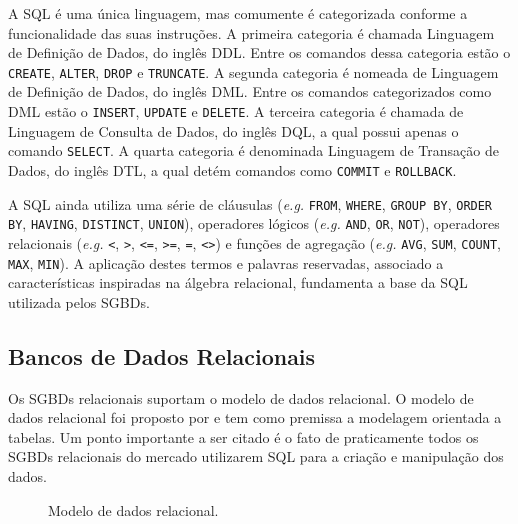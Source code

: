 A \ac{SQL} é uma única linguagem, mas comumente é categorizada conforme a funcionalidade das suas instruções. 
A primeira categoria é chamada Linguagem de Definição de Dados, do inglês \ac{DDL}. 
Entre os comandos dessa categoria estão o \texttt{CREATE}, \texttt{ALTER}, \texttt{DROP} e \texttt{TRUNCATE}. 
A segunda categoria é nomeada de Linguagem de Definição de Dados, do inglês \ac{DML}. 
Entre os comandos categorizados como \ac{DML} estão o \texttt{INSERT}, \texttt{UPDATE} e \texttt{DELETE}. 
A terceira categoria é chamada de Linguagem de Consulta de Dados, do inglês \ac{DQL}, a qual possui apenas o comando \texttt{SELECT}. 
A quarta categoria é denominada Linguagem de Transação de Dados, do inglês \ac{DTL}, a qual detém comandos como \texttt{COMMIT} e \texttt{ROLLBACK}.

A \ac{SQL} ainda utiliza uma série de cláusulas (\textit{e.g.} \texttt{FROM}, \texttt{WHERE}, \texttt{GROUP BY}, \texttt{ORDER BY}, \texttt{HAVING}, \texttt{DISTINCT}, \texttt{UNION}), operadores lógicos (\textit{e.g.} \texttt{AND}, \texttt{OR}, \texttt{NOT}), operadores relacionais (\textit{e.g.} \texttt{<}, \texttt{>}, \texttt{<=}, \texttt{>=}, \texttt{=}, \texttt{<>}) e funções de agregação (\textit{e.g.} \texttt{AVG}, \texttt{SUM}, \texttt{COUNT}, \texttt{MAX}, \texttt{MIN}). 
A aplicação destes termos e palavras reservadas, associado a características inspiradas na álgebra relacional, fundamenta a base da \ac{SQL} utilizada pelos \acp{SGBD}.

    \subsection{Bancos de Dados Relacionais} \label{ssec:SGBDRelacionais}

Os \acp{SGBD} relacionais suportam o modelo de dados relacional. 
O modelo de dados relacional foi proposto por  e tem como premissa a modelagem orientada a tabelas. 
Um ponto importante a ser citado é o fato de praticamente todos os \acp{SGBD} relacionais do mercado utilizarem \ac{SQL} para a criação e manipulação dos dados.

\begin{figure} [!htb]
    \centering
    \caption{Modelo de dados relacional.}
    \label{fig:ModeloRelacional}
    
\end{figure}

